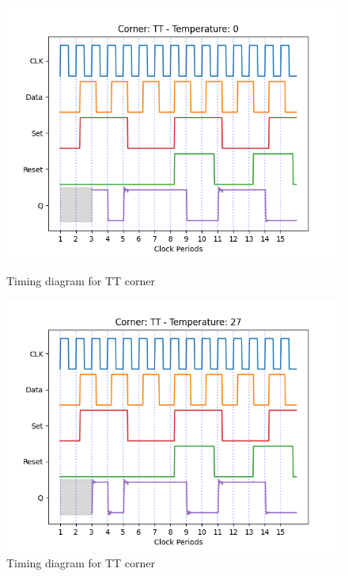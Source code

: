 \begin{figure}[H]
    \begin{minipage}{0.5\textwidth}
        \centering
        \includegraphics[width=\textwidth]{Figures/Aimspice_Plots/TT_0.png}
        \caption{Timing diagram for TT corner}
        \label{fig:TT0}
    \end{minipage}%
    \begin{minipage}{0.5\textwidth}
        \centering
        \includegraphics[width=\textwidth]{Figures/Aimspice_Plots/TT_27.png}
        \caption{Timing diagram for TT corner}
        \label{fig:TT27}
    \end{minipage}
\end{figure}
